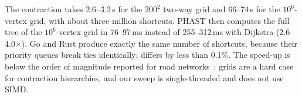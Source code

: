 The contraction takes 2.6--3.2\,s for the $200^2$ two-way grid and 66--74\,s for the $10^6$-vertex grid, with about
three million shortcuts. PHAST then computes the full tree of the $10^6$-vertex grid in 76--97\,ms instead of
255--312\,ms with Dijkstra (2.6--4.0$\times$). Go and Rust produce exactly the same number of shortcuts, because
their priority queues break ties identically; \cs{} differs by less than 0.1\%. The speed-up is below the order of
magnitude reported for road networks~\cite{delling2013phast}: grids are a hard case for contraction hierarchies, and
our sweep is single-threaded and does not use SIMD.
